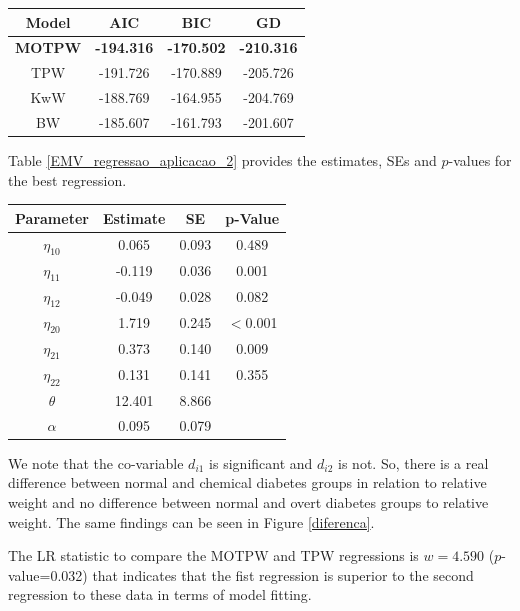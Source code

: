 \documentclass[12pt]{article}
\begin{document}
	\begin{table}[htb!]
		\vspace*{0.3cm}
		\begin{tabular}{cccc}
			\hline
			Model &AIC &BIC  &GD  \\
			\hline
			{\bf MOTPW} &{\bf -194.316}  &{\bf -170.502}  &{\bf -210.316}\\			
			TPW         &-191.726        &-170.889        &-205.726\\			
			KwW         &-188.769        &-164.955        &-204.769\\			
			BW          &-185.607        &-161.793        &-201.607\\			
			\hline
		\end{tabular}
	\end{table}
Table \ref{EMV_regressao_aplicacao_2} provides the estimates, SEs and $p$-values for the best regression.
	\begin{table}[htb!]
		\vspace*{0.3cm}
		\begin{tabular}{cccc}
			\hline
			Parameter     & Estimate   &SE      &p-Value\\
			\hline
			${\eta}_{10}$   &0.065  &0.093  &0.489\\
			${\eta}_{11}$   &-0.119 &0.036  &0.001\\
			${\eta}_{12}$   &-0.049 &0.028  &0.082\\
			\hline
			${\eta}_{20}$   &1.719 &0.245 &$<$0.001\\
			${\eta}_{21}$   &0.373 &0.140 &0.009\\
			${\eta}_{22}$   &0.131 &0.141 &0.355\\
			\hline
			${\theta}$      &12.401&8.866 &\\
			${\alpha}$      &0.095 &0.079 &\\		
			\hline
		\end{tabular}
	\end{table}

We note that the co-variable $d_{i1}$ is significant and  $d_{i2}$ is not. So, there is a real difference between
normal and chemical diabetes groups in relation to relative weight and no difference between normal and overt
diabetes groups to relative weight. The same findings can be seen in Figure \ref{diferenca}.

The LR statistic to compare the MOTPW and TPW regressions is $w=4.590$ ($p$-value=0.032) that indicates
that the fist regression is superior to the second regression to these data in terms of model fitting.
\end{document}
